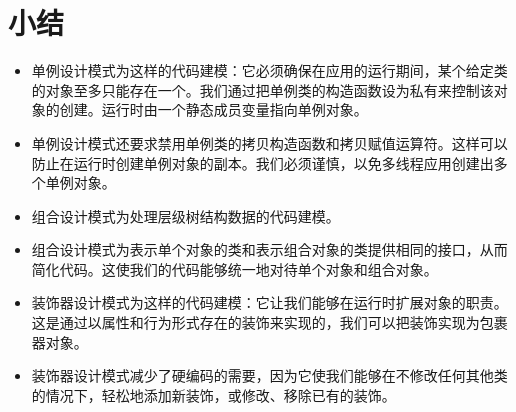 \section*{小结}

\begin{itemize}
\item 单例设计模式为这样的代码建模：它必须确保在应用的运行期间，某个给定类的对象至多只能存在一个。我们通过把单例类的构造函数设为私有来控制该对象的创建。运行时由一个静态成员变量指向单例对象。
\item 单例设计模式还要求禁用单例类的拷贝构造函数和拷贝赋值运算符。这样可以防止在运行时创建单例对象的副本。我们必须谨慎，以免多线程应用创建出多个单例对象。
\item 组合设计模式为处理层级树结构数据的代码建模。
\item 组合设计模式为表示单个对象的类和表示组合对象的类提供相同的接口，从而简化代码。这使我们的代码能够统一地对待单个对象和组合对象。
\item 装饰器设计模式为这样的代码建模：它让我们能够在运行时扩展对象的职责。这是通过以属性和行为形式存在的装饰来实现的，我们可以把装饰实现为包裹器对象。
\item 装饰器设计模式减少了硬编码的需要，因为它使我们能够在不修改任何其他类的情况下，轻松地添加新装饰，或修改、移除已有的装饰。
\end{itemize}
